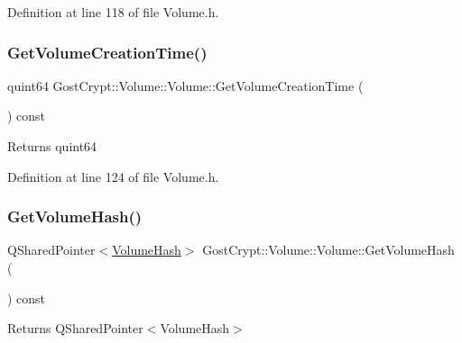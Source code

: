 Definition at line 118 of file Volume.\+h.

\mbox{\label{class_gost_crypt_1_1_volume_1_1_volume_a6e558cb50bff748e3a0f6e099e70a8fe}} 
\subsubsection{\texorpdfstring{Get\+Volume\+Creation\+Time()}{GetVolumeCreationTime()}}
{\footnotesize\ttfamily quint64 Gost\+Crypt\+::\+Volume\+::\+Volume\+::\+Get\+Volume\+Creation\+Time (\begin{DoxyParamCaption}{ }\end{DoxyParamCaption}) const\hspace{0.3cm}{\ttfamily [inline]}}

\begin{DoxyReturn}{Returns}
quint64 
\end{DoxyReturn}


Definition at line 124 of file Volume.\+h.

\mbox{\label{class_gost_crypt_1_1_volume_1_1_volume_ab78cd77d6445819e67f360c26cc9faca}} 
\subsubsection{\texorpdfstring{Get\+Volume\+Hash()}{GetVolumeHash()}}
{\footnotesize\ttfamily Q\+Shared\+Pointer$<$\hyperlink{class_gost_crypt_1_1_volume_1_1_volume_hash}{Volume\+Hash}$>$ Gost\+Crypt\+::\+Volume\+::\+Volume\+::\+Get\+Volume\+Hash (\begin{DoxyParamCaption}{ }\end{DoxyParamCaption}) const\hspace{0.3cm}{\ttfamily [inline]}}

\begin{DoxyReturn}{Returns}
Q\+Shared\+Pointer$<$\+Volume\+Hash$>$ 
\end{DoxyReturn}


